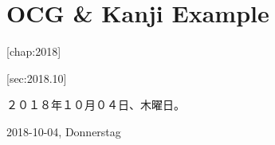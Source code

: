 \part[Different for ToC]%
{OCG \& Kanji Example}%
\@openrightfalse\makeatother%
\label{part:ocgex}%
%
%
[chap:2018]%

[sec:2018.10]%


%
２０１８年１０月０４日、木曜日。%
\ropre
\begin{romaji}
2018-10-04, Donnerstag%
\end{romaji}









	
%

%
%
%